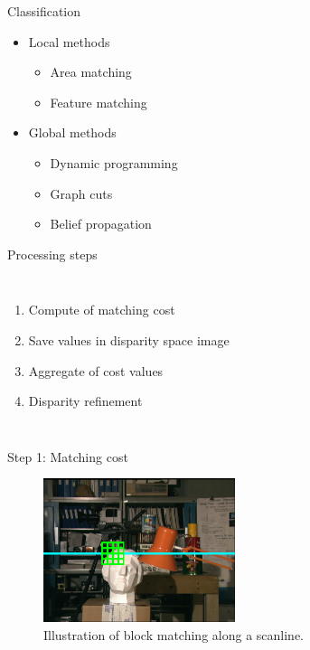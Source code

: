 \documentclass[10pt]{beamer}
\begin{document}
\begin{frame}[fragile]{Classification}
  \begin{itemize}
    \item Local methods
    \begin{itemize}
      \item Area matching
      \item Feature matching
    \end{itemize}
    \item Global methods
    \begin{itemize}
      \item Dynamic programming
      \item Graph cuts
      \item Belief propagation
    \end{itemize}
  \end{itemize}
\end{frame}

\begin{frame}[fragile]{Processing steps}
  \begin{columns}[T,onlytextwidth]
    \begin{enumerate}
      \item Compute of matching cost
      \item Save values in disparity space image
      \item Aggregate of cost values
      \item Disparity refinement
    \end{enumerate}
  \end{columns}
\end{frame}

\begin{frame}[fragile]{Step 1: Matching cost}
  \begin{figure}[h!]
    \centering
    \includegraphics[width=0.5\textwidth]{../paper/src/images/tsukuba-block.png}
    \caption[Block matching along scanlines]{Illustration of block matching along a scanline.}
  \end{figure}
\end{frame}
\end{document}
